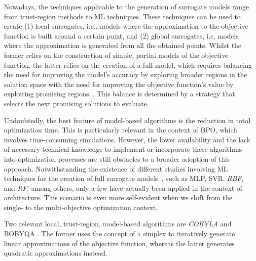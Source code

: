 	Nowadays, the techniques applicable to the generation of surrogate models range from trust-region methods to \ac{ML} techniques. These techniques can be used to create (1) local surrogates, i.e., models where the approximation to the objective function is built around a certain point, and (2) global surrogates, i.e, models where the approximation is generated from all the obtained points. Whilst the former relies on the construction of simple, partial models of the objective function, the latter relies on the creation of a full model, which requires balancing the need for improving the model's accuracy by exploring broader regions in the solution space with the need for improving the objective function's value by exploiting promising regions~\cite{Koziel2011}. This balance is determined by a strategy that selects the next promising solutions to evaluate. 
	
	Undoubtedly, the best feature of model-based algorithms is the reduction in total optimization time. This is particularly relevant in the context of \ac{BPO}, which involves time-consuming simulations. However, the lower availability and the lack of necessary technical knowledge to implement or incorporate these algorithms into optimization processes are still obstacles to a broader adoption of this approach. Notwithstanding the existence of different studies involving \ac{ML} techniques for the creation of full surrogate models~\cite{Koziel2011, Forrester2009SBO}, such as \ac{MLP}, \ac{SVR}, \textit{\ac{RBF}}, and \textit{\ac{RF}}, among others, only a few have actually been applied in the context of architecture. This scenario is even more self-evident when we shift from the single- to the multi-objective optimization context.
	
	
	Two relevant local, trust-region, model-based algorithms are \textit{\ac{COBYLA}} and \ac{BOBYQA} \cite{Powell1994COBYLA, Powell2009BOBYQA}. The former uses the concept of a simplex to iteratively generate linear approximations of the objective function, whereas the latter generates quadratic approximations instead. %
	
